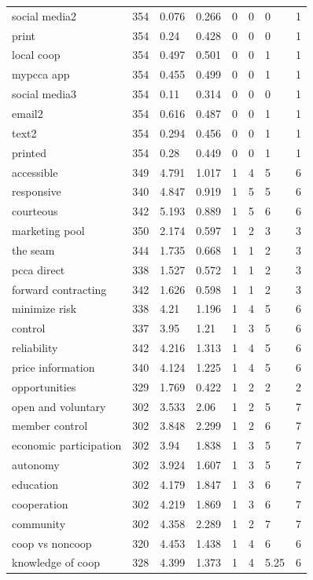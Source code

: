 \documentclass[
]{article}
\begin{document}
\begin{table}
\begin{tabular}[t]{llllllll}
social media2 & 354 & 0.076 & 0.266 & 0 & 0 & 0 & 1\\
\addlinespace
print & 354 & 0.24 & 0.428 & 0 & 0 & 0 & 1\\
local coop & 354 & 0.497 & 0.501 & 0 & 0 & 1 & 1\\
mypcca app & 354 & 0.455 & 0.499 & 0 & 0 & 1 & 1\\
social media3 & 354 & 0.11 & 0.314 & 0 & 0 & 0 & 1\\
email2 & 354 & 0.616 & 0.487 & 0 & 0 & 1 & 1\\
\addlinespace
text2 & 354 & 0.294 & 0.456 & 0 & 0 & 1 & 1\\
printed & 354 & 0.28 & 0.449 & 0 & 0 & 1 & 1\\
accessible & 349 & 4.791 & 1.017 & 1 & 4 & 5 & 6\\
responsive & 340 & 4.847 & 0.919 & 1 & 5 & 5 & 6\\
courteous & 342 & 5.193 & 0.889 & 1 & 5 & 6 & 6\\
\addlinespace
marketing pool & 350 & 2.174 & 0.597 & 1 & 2 & 3 & 3\\
the seam & 344 & 1.735 & 0.668 & 1 & 1 & 2 & 3\\
pcca direct & 338 & 1.527 & 0.572 & 1 & 1 & 2 & 3\\
forward contracting & 342 & 1.626 & 0.598 & 1 & 1 & 2 & 3\\
minimize risk & 338 & 4.21 & 1.196 & 1 & 4 & 5 & 6\\
\addlinespace
control & 337 & 3.95 & 1.21 & 1 & 3 & 5 & 6\\
reliability & 342 & 4.216 & 1.313 & 1 & 4 & 5 & 6\\
price information & 340 & 4.124 & 1.225 & 1 & 4 & 5 & 6\\
opportunities & 329 & 1.769 & 0.422 & 1 & 2 & 2 & 2\\
open and voluntary & 302 & 3.533 & 2.06 & 1 & 2 & 5 & 7\\
\addlinespace
member control & 302 & 3.848 & 2.299 & 1 & 2 & 6 & 7\\
economic participation & 302 & 3.94 & 1.838 & 1 & 3 & 5 & 7\\
autonomy & 302 & 3.924 & 1.607 & 1 & 3 & 5 & 7\\
education & 302 & 4.179 & 1.847 & 1 & 3 & 6 & 7\\
cooperation & 302 & 4.219 & 1.869 & 1 & 3 & 6 & 7\\
\addlinespace
community & 302 & 4.358 & 2.289 & 1 & 2 & 7 & 7\\
coop vs noncoop & 320 & 4.453 & 1.438 & 1 & 4 & 6 & 6\\
knowledge of coop & 328 & 4.399 & 1.373 & 1 & 4 & 5.25 & 6\\
\bottomrule
\end{tabular}
\end{table}
\end{document}
